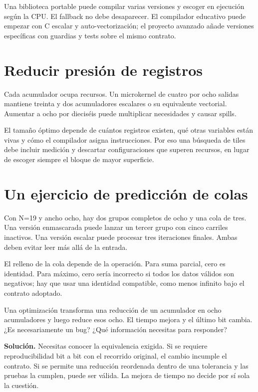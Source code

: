 \documentclass[12pt,a4paper,oneside]{report}
\begin{document}
Una biblioteca portable puede compilar varias versiones y escoger en ejecución según la CPU. El fallback no debe desaparecer. El compilador educativo puede empezar con C escalar y auto-vectorización; el proyecto avanzado añade versiones específicas con guardias y tests sobre el mismo contrato.

\section{Reducir presión de registros}
Cada acumulador ocupa recursos. Un microkernel de cuatro por ocho salidas mantiene treinta y dos acumuladores escalares o su equivalente vectorial. Aumentar a ocho por dieciséis puede multiplicar necesidades y causar spills.

El tamaño óptimo depende de cuántos registros existen, qué otras variables están vivas y cómo el compilador asigna instrucciones. Por eso una búsqueda de tiles debe incluir medición y descartar configuraciones que superen recursos, en lugar de escoger siempre el bloque de mayor superficie.

\section{Un ejercicio de predicción de colas}
Con N=19 y ancho ocho, hay dos grupos completos de ocho y una cola de tres. Una versión enmascarada puede lanzar un tercer grupo con cinco carriles inactivos. Una versión escalar puede procesar tres iteraciones finales. Ambas deben evitar leer más allá de la entrada.

El relleno de la cola depende de la operación. Para suma parcial, cero es identidad. Para máximo, cero sería incorrecto si todos los datos válidos son negativos; hay que usar una identidad compatible, como menos infinito bajo el contrato adoptado.

\begin{practica}
Una optimización transforma una reducción de un acumulador en ocho acumuladores y luego reduce esos ocho. El tiempo mejora y el último bit cambia. ¿Es necesariamente un bug? ¿Qué información necesitas para responder?

\end{practica}
\textbf{Solución.} Necesitas conocer la equivalencia exigida. Si se requiere reproducibilidad bit a bit con el recorrido original, el cambio incumple el contrato. Si se permite una reducción reordenada dentro de una tolerancia y las pruebas la cumplen, puede ser válida. La mejora de tiempo no decide por sí sola la cuestión.
\end{document}
